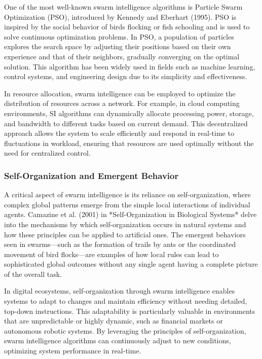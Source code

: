 \documentclass[12pt,twoside]{article}
\begin{document}
One of the most well-known swarm intelligence algorithms is Particle Swarm Optimization (PSO), introduced by Kennedy and Eberhart (1995). PSO is inspired by the social behavior of birds flocking or fish schooling and is used to solve continuous optimization problems. In PSO, a population of particles explores the search space by adjusting their positions based on their own experience and that of their neighbors, gradually converging on the optimal solution. This algorithm has been widely used in fields such as machine learning, control systems, and engineering design due to its simplicity and effectiveness.

In resource allocation, swarm intelligence can be employed to optimize the distribution of resources across a network. For example, in cloud computing environments, SI algorithms can dynamically allocate processing power, storage, and bandwidth to different tasks based on current demand. This decentralized approach allows the system to scale efficiently and respond in real-time to fluctuations in workload, ensuring that resources are used optimally without the need for centralized control.

\subsubsection{Self-Organization and Emergent Behavior}

A critical aspect of swarm intelligence is its reliance on self-organization, where complex global patterns emerge from the simple local interactions of individual agents. Camazine et al. (2001) in *Self-Organization in Biological Systems* delve into the mechanisms by which self-organization occurs in natural systems and how these principles can be applied to artificial ones. The emergent behaviors seen in swarms—such as the formation of trails by ants or the coordinated movement of bird flocks—are examples of how local rules can lead to sophisticated global outcomes without any single agent having a complete picture of the overall task.

In digital ecosystems, self-organization through swarm intelligence enables systems to adapt to changes and maintain efficiency without needing detailed, top-down instructions. This adaptability is particularly valuable in environments that are unpredictable or highly dynamic, such as financial markets or autonomous robotic systems. By leveraging the principles of self-organization, swarm intelligence algorithms can continuously adjust to new conditions, optimizing system performance in real-time.
\end{document}
